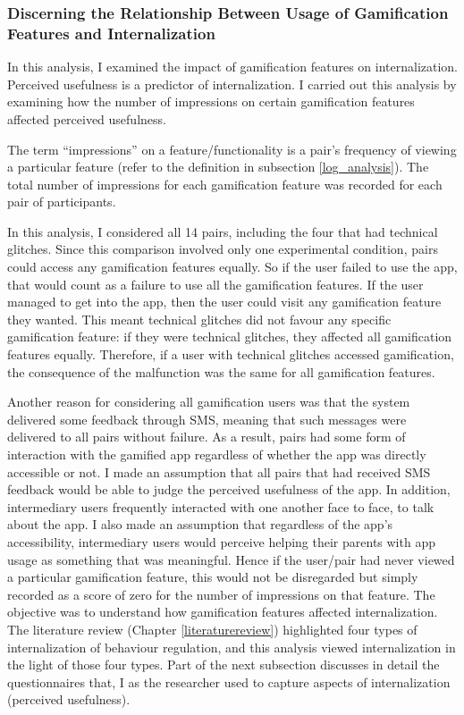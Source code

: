 \subsubsection*{Discerning the Relationship Between Usage of Gamification Features and Internalization}
In this analysis, I examined the impact of gamification features on internalization. Perceived usefulness is a predictor of internalization. I carried out this analysis by examining how the number of impressions on certain gamification features affected perceived usefulness.
 
The term ``impressions'' on a feature/functionality is a pair's frequency of viewing a particular feature (refer to the definition in subsection \ref{log_analysis}). The total number of impressions for each gamification feature was recorded for each pair of participants.

In this analysis, I considered all 14 pairs, including the four that had technical glitches. Since this comparison involved only one experimental condition, pairs could access any gamification features equally. So if the user failed to use the app, that would count as a failure to use all the gamification features. If the user managed to get into the app, then the user could visit any  gamification feature they wanted. This meant technical glitches did not favour any specific gamification feature: if they were technical glitches, they affected all gamification features equally. Therefore, if a user with technical glitches accessed  gamification, the consequence of the malfunction was the same for all gamification features. 

Another reason for considering all gamification users was that the system delivered some feedback through SMS, meaning that such messages were delivered to all pairs without failure. As a result, pairs had some form of interaction with the gamified app regardless of whether the app was directly accessible or not.  I made an assumption that all pairs that had received SMS feedback would be able to judge the perceived usefulness of the app. In addition, intermediary users frequently interacted with one another face to face, to talk about the app.  I also made an assumption that regardless of the app's accessibility, intermediary users would perceive helping their parents with app usage as something that was meaningful. Hence if the user/pair had never viewed a particular gamification feature, this would not be disregarded but simply recorded as a score of zero for the number of impressions on that feature. The objective was to understand how gamification features affected internalization. The literature review (Chapter \ref{literaturereview}) highlighted four types of internalization of behaviour regulation, and this analysis viewed internalization in the light of those four types. Part of the next subsection discusses in detail the questionnaires that, I as the researcher used to capture aspects of internalization (perceived usefulness).

